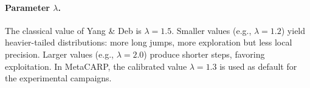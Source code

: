 \documentclass[12pt, a4paper]{article}
\begin{document}
\paragraph{Parameter $\lambda$.}
The classical value of Yang \& Deb is $\lambda = 1.5$. Smaller values (e.g.,
$\lambda = 1.2$) yield heavier-tailed distributions: more long jumps, more
exploration but less local precision. Larger values (e.g., $\lambda = 2.0$)
produce shorter steps, favoring exploitation. In MetaCARP, the calibrated value
$\lambda = 1.3$ is used as default for the experimental campaigns.
\end{document}
